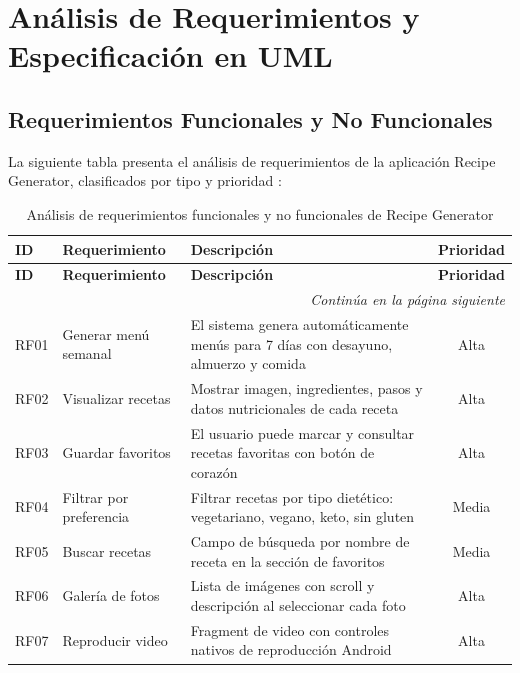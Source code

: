 \documentclass[stu, 12pt, letterpaper, donotrepeattitle, floatsintext, natbib]{apa7}
\begin{document}
\section{Análisis de Requerimientos y Especificación en UML}

\subsection{Requerimientos Funcionales y No Funcionales}

La siguiente tabla presenta el análisis de requerimientos de la aplicación Recipe
Generator, clasificados por tipo y prioridad \citep{robledo2017}:

\begin{longtable}{@{}lp{3cm}p{8.5cm}c@{}}
\caption{Análisis de requerimientos funcionales y no funcionales de Recipe Generator}
\label{tab:requerimientos}\\
\toprule
\textbf{ID} & \textbf{Requerimiento} & \textbf{Descripción} & \textbf{Prioridad} \\
\midrule
\endfirsthead
\toprule
\textbf{ID} & \textbf{Requerimiento} & \textbf{Descripción} & \textbf{Prioridad} \\
\midrule
\endhead
\midrule
\multicolumn{4}{r}{\small\textit{Continúa en la página siguiente}}\\
\endfoot
\bottomrule
\endlastfoot
RF01  & Generar menú semanal    & El sistema genera automáticamente menús para 7 días con desayuno, almuerzo y comida & Alta \\[3pt]
RF02  & Visualizar recetas      & Mostrar imagen, ingredientes, pasos y datos nutricionales de cada receta & Alta \\[3pt]
RF03  & Guardar favoritos       & El usuario puede marcar y consultar recetas favoritas con botón de corazón & Alta \\[3pt]
RF04  & Filtrar por preferencia & Filtrar recetas por tipo dietético: vegetariano, vegano, keto, sin gluten & Media \\[3pt]
RF05  & Buscar recetas          & Campo de búsqueda por nombre de receta en la sección de favoritos & Media \\[3pt]
RF06  & Galería de fotos        & Lista de imágenes con scroll y descripción al seleccionar cada foto & Alta \\[3pt]
RF07  & Reproducir video        & Fragment de video con controles nativos de reproducción Android & Alta \\[3pt]

\end{longtable}
\end{document}
